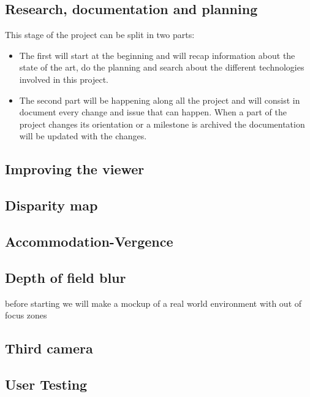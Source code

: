 \documentclass[10pt,a4paper,twocolumn,twoside]{article}
\begin{document}
\subsection{Research, documentation and planning}
This stage of the project can be split in two parts:
\begin{itemize}
	\item The first will start at the beginning and will recap information about the state of the art, do the planning and search about the different technologies involved in this project. 
	\item The second part will be happening along all the project and will consist in document every change and issue that can happen. When a part of the project changes its orientation or a milestone is archived the documentation will be updated with the changes. 
\end{itemize}
\subsection{Improving the viewer}
\subsection{Disparity map}
\subsection{Accommodation-Vergence}
\subsection{Depth of field blur}
before starting we will make a mockup of a real world environment with out of focus zones 
\subsection{Third camera}
\subsection{User Testing}
\end{document}
